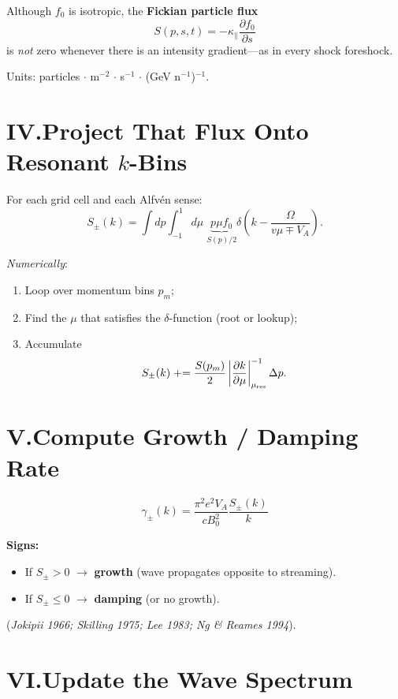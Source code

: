 Although $f_0$ is isotropic, the \textbf{Fickian particle flux}
\[
\boxed{ S(p,s,t) = -\kappa_\parallel \frac{\partial f_0}{\partial s} }
\tag{2}
\]
is \textit{not} zero whenever there is an intensity gradient---as in every shock foreshock.

\noindent
Units: particles $\cdot$ m$^{-2}$ $\cdot$ s$^{-1}$ $\cdot$ (GeV n$^{-1}$)$^{-1}$.

\section*{IV.\quad Project That Flux Onto \textbf{Resonant $k$-Bins}}

For each grid cell and each Alfvén sense:
\[
S_\pm(k) =
\int dp \int_{-1}^{1} d\mu\;
\underbrace{p\mu f_0}_{\displaystyle S(p)/2}
\delta\left( k - \frac{\Omega}{v\mu \mp V_A} \right).
\tag{3}
\]

\noindent
\textit{Numerically}:
\begin{enumerate}
\item Loop over momentum bins $p_m$;
\item Find the $\mu$ that satisfies the $\delta$-function (root or lookup);
\item Accumulate
\[
S_\pm(k) \mathrel{{+}{=}} \frac{S(p_m)}{2}
\left| \frac{\partial k}{\partial \mu} \right|^{-1}_{\mu_{\rm res}} \Delta p.
\]
\end{enumerate}

\section*{V.\quad Compute \textbf{Growth / Damping Rate}}

\[
\boxed{
\gamma_\pm(k) =
\frac{\pi^2 e^2 V_A}{c B_0^2}
\frac{S_\pm(k)}{k}
}
\tag{4}
\]

\textbf{Signs:}
\begin{itemize}
\item If $S_\pm > 0$ $\rightarrow$ \textbf{growth} (wave propagates opposite to streaming).
\item If $S_\pm \leq 0$ $\rightarrow$ \textbf{damping} (or no growth).
\end{itemize}

\noindent
(\textit{Jokipii 1966; Skilling 1975; Lee 1983; Ng \& Reames 1994}).

\section*{VI.\quad Update the \textbf{Wave Spectrum}}

